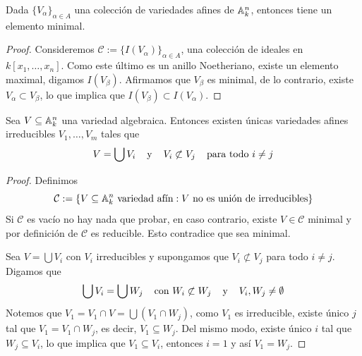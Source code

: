 \documentclass[11pt]{article}
\begin{document}
\begin{lema}
    Dada $\{V_{\alpha}\}_{\alpha\in A}$ una colección de variedades afines de $\mathbb{A}_{k}^{n}$, 
    entonces tiene un elemento minimal.
\end{lema}

\begin{proof}
    Consideremos $\mathcal{C}:=\{I(V_{\alpha})\}_{\alpha\in A}$, una colección de ideales en 
    $k[x_{1},\dots,x_{n}]$. Como este último es un anillo Noetheriano, existe un elemento maximal, 
    digamos $I(V_{\beta})$. Afirmamos que $V_{\beta}$ es minimal, de lo contrario, existe 
    $V_{\alpha}\subset V_{\beta}$, lo que implica que $I(V_{\beta})\subset I(V_{\alpha})$.
\end{proof}

\begin{teo}
    Sea $V\subseteq\mathbb{A}_{k}^{n}$ una variedad algebraica. Entonces existen únicas variedades afines
    irreducibles $V_{1},\dots, V_{m}$ tales que
    \begin{equation*}
        V=\bigcup V_{i} \hspace{4mm}\text{y}\hspace{4mm} V_{i}\not\subset V_{j} \hspace{4mm}\text{para todo }i\neq j
    \end{equation*}
\end{teo}

\newpage
\begin{proof}
    Definimos
    \begin{equation*}
        \mathcal{C}:=\{
            V\subseteq\mathbb{A}_{k}^{n}\text{ variedad afín}:V\text{ no es unión de irreducibles}
        \}
    \end{equation*}
    Si $\mathcal{C}$ es vacío no hay nada que probar, en caso contrario, existe $V\in\mathcal{C}$
    minimal y por definición de $\mathcal{C}$ es reducible. Esto contradice que sea minimal.

    Sea $V=\bigcup V_{i}$ con $V_{i}$ irreducibles y supongamos que $V_{i}\not\subset V_{j}$ para
    todo $i\neq j$. Digamos que
    \begin{equation*}
        \bigcup V_{i}=\bigcup W_{j} 
        \hspace{4mm}\text{con }W_{i}\not\subset W_{j} \hspace{4mm}\text{y}\hspace{4mm} V_{i},W_{j}\neq\emptyset
    \end{equation*}
    Notemos que $V_{1}=V_{1}\cap V=\bigcup(V_{1}\cap W_{j})$, como $V_{1}$ es irreducible, existe
    único $j$ tal que $V_{1}=V_{1}\cap W_{j}$, es decir, $V_{1}\subseteq W_{j}$. Del mismo modo,
    existe único $i$ tal que $W_{j}\subseteq V_{i}$, lo que implica que $V_{1}\subseteq V_{i}$,
    entonces $i=1$ y así $V_{1}=W_{j}$.
\end{proof}
\end{document}

